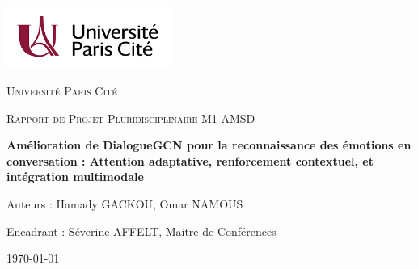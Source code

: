 \documentclass[a4paper,11pt]{article}
\begin{document}
\begin{titlepage}
  \centering
  \includegraphics[width=0.4\textwidth]{images/logo_uni.png}\par\vspace{1cm}
  {\scshape\LARGE Université Paris Cité\par}
  \vspace{1cm}
  {\scshape\Large Rapport de Projet Pluridisciplinaire M1 AMSD\par}
  \vspace{1.5cm}
  {\huge\bfseries Amélioration de DialogueGCN pour la reconnaissance des émotions en conversation : Attention adaptative, renforcement contextuel, et intégration multimodale\par}
  \vfill
  {\large Auteurs : Hamady GACKOU, Omar NAMOUS\par}
  {\large Encadrant : Séverine AFFELT, Maitre de Conférences\par}
  \vspace{1cm}
  {\large \today}\par
\end{titlepage}








\end{document}

